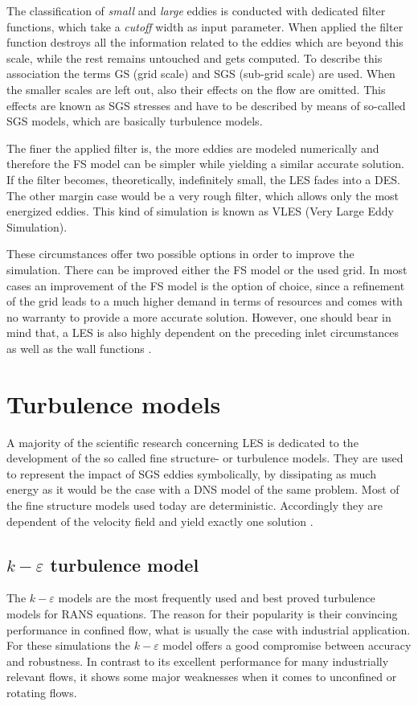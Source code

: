 The classification of \emph{small} and \emph{large} eddies is conducted with dedicated filter functions, which take a \emph{cutoff} width as input parameter. When applied the filter function destroys all the information related to the eddies which are beyond this scale, while the rest remains untouched and gets computed. To describe this association the terms GS (grid scale) and SGS (sub-grid scale) are used. When the smaller scales are left out, also their effects on the flow are omitted. This effects are known as SGS stresses and have to be described by means of so-called SGS models, which are basically turbulence models.

The finer the applied filter is, the more eddies are modeled numerically and therefore the FS model can be simpler while yielding a similar accurate solution. If the filter becomes, theoretically, indefinitely small, the LES fades into a DES. The other margin case would be a very rough filter, which allows only the most energized eddies. This kind of simulation is known as VLES (Very Large Eddy Simulation).

These circumstances offer two possible options in order to improve the simulation. There can be improved either the FS model or the used grid. In most cases an improvement of the FS model is the option of choice, since a refinement of the grid leads to a much higher demand in terms of resources and comes with no warranty to provide a more accurate solution. However, one should bear in mind that, a LES is also highly dependent on the preceding inlet circumstances as well as the wall functions \cite{versteeg, frohlich}.

\section{Turbulence models}
A majority of the scientific research concerning LES is dedicated to the development of the so called fine structure- or turbulence models. They are used to represent the impact of SGS eddies symbolically, by dissipating as much energy as it would be the case with a DNS model of the same problem. Most of the fine structure models used today are deterministic. Accordingly they are dependent of the velocity field and yield exactly one solution \cite{versteeg}.
\subsection{$k-\varepsilon$ turbulence model}
The $k-\varepsilon$  models are the most frequently used and best proved turbulence models for RANS equations. The reason for their popularity is their convincing performance in confined flow, what is usually the case with industrial application. For these simulations the $k-\varepsilon$ model offers a good compromise between accuracy and robustness. In contrast to its excellent performance for many industrially relevant flows, it shows some major weaknesses when it comes to unconfined or rotating flows.

